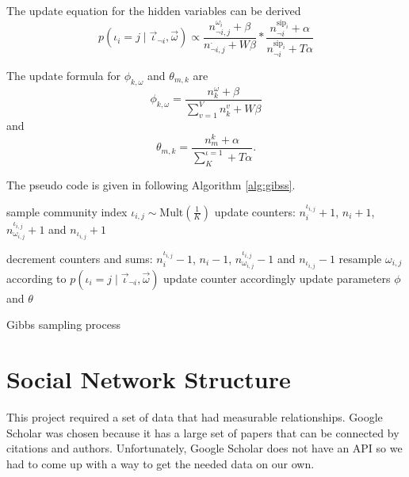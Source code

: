 \documentclass[letterpaper]{article}
\begin{document}
The update equation for the hidden variables can be derived
\begin{equation}
p( \iota_{i} = j \mid \vec{\iota}_{\neg i}, \vec{\omega}) \propto 
\frac{ n^{\omega_{i}}_{\neg i, j}+\beta }{ n^{\cdot}_{\neg i, j}+W\beta } \ast \frac{ n^{\mbox{sip}_{i}}_{\neg i}+\alpha }{ n^{\mbox{sip}_{i}}_{\neg i}+T\alpha }
\end{equation}

The update formula for $ \phi_{k,\omega} $ and $ \theta_{m,k} $ are
\begin{equation}
\phi_{k,\omega} = \frac{n^{\omega}_{k}+\beta}{\sum_{v=1}^{V}n^{v}_{k}+W\beta}
\end{equation}
and
\begin{equation}
\theta_{m,k} = \frac{n^{k}_{m}+\alpha}{\sum_{K}^{\iota=1}+T\alpha}.
\end{equation}

The pseudo code is given in following Algorithm \ref{alg:gibss}.
\begin{algorithm}
\label{alg:gibss}
	\begin{algorithmic}[1]
		\State sample community index $ \iota_{i,j} \sim \mbox{Mult}(\frac{1}{K}) $
		\State update counters: $ n^{\iota_{i,j}}_{i} + 1 $, $ n_{i} + 1 $, $ n^{\iota_{i,j}}_{\omega_{i,j}} +1 $ and $ n_{\iota_{i,j}} +1 $
		\EndFor
		\EndFor
		
		\State decrement counters and sums:  $ n^{\iota_{i,j}}_{i} - 1 $, $ n_{i} - 1 $, $ n^{\iota_{i,j}}_{\omega_{i,j}} - 1 $ and $ n_{\iota_{i,j}} - 1 $ 
		\State resample $ \omega_{i,j} $ according to  $ p(\iota_{i}=j \mid \vec{\iota}_{\neg i}, \vec{\omega} ) $
		\State update counter accordingly
		\EndFor
		\EndFor
		\State update parameters $ \phi $ and $ \theta $
		\EndIf
		\EndWhile
	\end{algorithmic}
	\caption{Gibbs sampling process}
\end{algorithm}


\section{Social Network Structure}

This project required a set of data that had measurable relationships.
Google Scholar was chosen because it has a large set of papers that can be connected by citations and authors.
Unfortunately, Google Scholar does not have an API so we had to come up with a way to get the needed data on our own.
\end{document}
